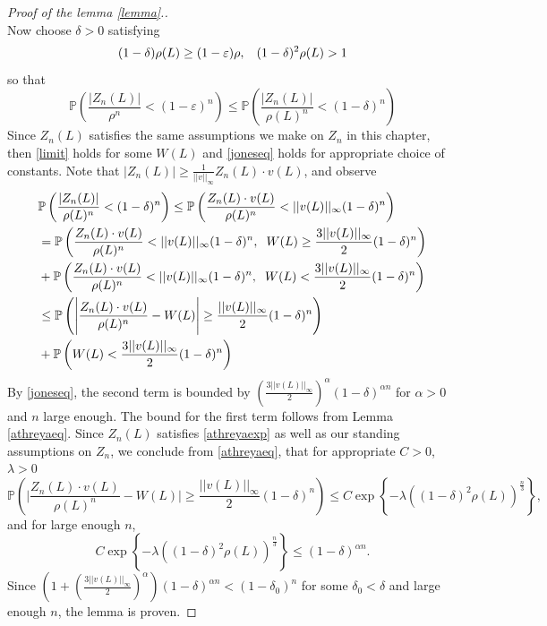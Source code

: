 \documentclass[12pt]{article}
\numberwithin{equation}{section}
\begin{document}
\begin{proof}[Proof of the lemma \ref{lemma}.]
\[         \]
         Now choose $\delta >0$ satisfying
         \[
         (1 - \delta)\rho{(L)} \geq (1 - \varepsilon) \rho, \hspace{3mm} (1-\delta)^2\rho(L) > 1
         \]
         so that 
         \[ \mathbb{P} \left(\frac{|Z_n(L)|} {\rho^n} <  {(1-\varepsilon)^n} \right) \leq  \mathbb{P} \left(\frac{|Z_n(L)|} {\rho(L)^n} <  {(1-\delta)^n} \right)\]
         Since $Z_n(L)$ satisfies the same assumptions we make on $Z_n$ in this chapter, then \eqref{limit} holds for some $W(L)$ and \eqref{joneseq} holds for appropriate choice of constants. Note that $|Z_n(L)| \geq \frac 1 {||v||_\infty}Z_n(L)\cdot v(L)$, and observe 
        \begin{align*}
        &\mathbb{P} \left(\frac{|Z_n(L)|} {\rho(L)^n}  <  {(1-\delta)^n} \right) \leq \mathbb{P} \left(\frac{Z_n(L) \cdot v(L)} {\rho(L)^n}  <  ||v(L)||_\infty  {(1-\delta)^n} \right)  \\ &= \mathbb{P} \left(\frac{Z_n(L) \cdot v(L)} {\rho(L)^n}  <  ||v(L)||_\infty  {(1-\delta)^n}, \hspace{2mm} W(L)  \geq  \frac {3 ||v(L)||_\infty } 2{(1- \delta )^n}\right) \\ &+ \mathbb{P} \left(\frac{Z_n(L) \cdot v(L)} {\rho(L)^n}  <  ||v(L)||_\infty  {(1-\delta)^n}, \hspace{2mm} W(L)  <  \frac {3 ||v(L)||_\infty } 2{(1- \delta )^n}\right)
        \\&\leq \mathbb{P} \left( \Bigg|\frac{Z_n(L)\cdot v(L)} {\rho(L)^n} - W(L) \Bigg| \geq  \frac {||v(L)||_\infty } 2{(1- \delta )^n}\right)
        \\&+ \mathbb{P} \left(  W(L)  <  \frac {3 ||v(L)||_\infty } 2{(1- \delta )^n} \right)
        \end{align*}
        By \eqref{joneseq}, the second term is bounded by $\left(\frac {3  ||v(L)||_\infty } {2}\right)^{\alpha} (1- \delta )^{\alpha n} $ for $\alpha >0$ and $n$ large enough.
        The bound for the first term follows from Lemma \ref{athreyaeq}. Since $Z_n(L)$ satisfies \eqref{athreyaexp} as well as our standing assumptions on $Z_n$, we conclude from \ref{athreyaeq}, that for appropriate $C > 0$, $\lambda > 0$
        \[
        \mathbb{P} \left( \Bigg|\frac{Z_n(L) \cdot v(L)} {\rho(L)^n} - W(L) \Bigg| \geq  \frac {||v(L)||_\infty} 2{(1- \delta )^n}\right) \leq C \exp\left\{-\lambda \left((1-\delta)^2 \rho(L) \right)^{\frac n 3} \right\},
        \]
        and for large enough $n$, 
        \[
        C \exp\left\{-\lambda \left((1-\delta)^2 \rho(L) \right)^{\frac n 3} \right\} \leq (1-\delta)^{\alpha n}.
        \]
        Since $ \left(1 + \left(\frac {3  ||v(L)||_\infty } {2}\right)^{\alpha} \right)(1-\delta)^{\alpha n}  < (1-\delta_0)^n$ for some $\delta_0 < \delta$ and large enough $n$, the lemma is proven.
        \end{proof}
\end{document}
